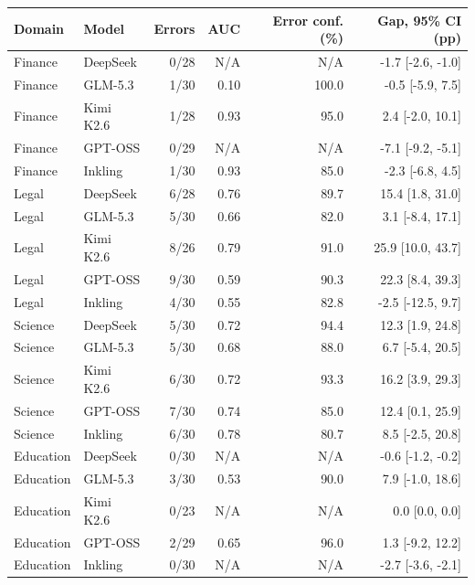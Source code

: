 \begin{tabular}{llrrrr}
\toprule
Domain & Model & Errors & AUC & Error conf. (\%) & Gap, 95\% CI (pp) \\
\midrule
Finance & DeepSeek & 0/28 & N/A & N/A & -1.7 [-2.6, -1.0] \\
Finance & GLM-5.3 & 1/30 & 0.10 & 100.0 & -0.5 [-5.9, 7.5] \\
Finance & Kimi K2.6 & 1/28 & 0.93 & 95.0 & 2.4 [-2.0, 10.1] \\
Finance & GPT-OSS & 0/29 & N/A & N/A & -7.1 [-9.2, -5.1] \\
Finance & Inkling & 1/30 & 0.93 & 85.0 & -2.3 [-6.8, 4.5] \\
Legal & DeepSeek & 6/28 & 0.76 & 89.7 & 15.4 [1.8, 31.0] \\
Legal & GLM-5.3 & 5/30 & 0.66 & 82.0 & 3.1 [-8.4, 17.1] \\
Legal & Kimi K2.6 & 8/26 & 0.79 & 91.0 & 25.9 [10.0, 43.7] \\
Legal & GPT-OSS & 9/30 & 0.59 & 90.3 & 22.3 [8.4, 39.3] \\
Legal & Inkling & 4/30 & 0.55 & 82.8 & -2.5 [-12.5, 9.7] \\
Science & DeepSeek & 5/30 & 0.72 & 94.4 & 12.3 [1.9, 24.8] \\
Science & GLM-5.3 & 5/30 & 0.68 & 88.0 & 6.7 [-5.4, 20.5] \\
Science & Kimi K2.6 & 6/30 & 0.72 & 93.3 & 16.2 [3.9, 29.3] \\
Science & GPT-OSS & 7/30 & 0.74 & 85.0 & 12.4 [0.1, 25.9] \\
Science & Inkling & 6/30 & 0.78 & 80.7 & 8.5 [-2.5, 20.8] \\
Education & DeepSeek & 0/30 & N/A & N/A & -0.6 [-1.2, -0.2] \\
Education & GLM-5.3 & 3/30 & 0.53 & 90.0 & 7.9 [-1.0, 18.6] \\
Education & Kimi K2.6 & 0/23 & N/A & N/A & 0.0 [0.0, 0.0] \\
Education & GPT-OSS & 2/29 & 0.65 & 96.0 & 1.3 [-9.2, 12.2] \\
Education & Inkling & 0/30 & N/A & N/A & -2.7 [-3.6, -2.1] \\
\bottomrule
\end{tabular}
